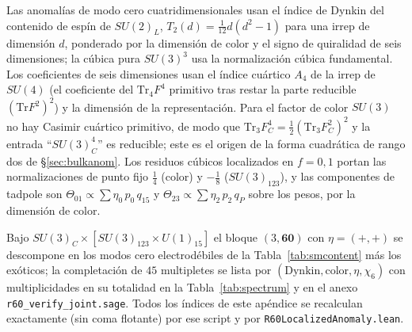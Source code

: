 \documentclass[11pt,a4paper]{article}
\newcommand{\Tr}{\mathrm{Tr}}
\begin{document}
Las anomal\'ias de modo cero cuatridimensionales usan el \'indice de Dynkin del contenido de
esp\'in de $SU(2)_L$, $T_2(d)=\tfrac1{12}d(d^2-1)$ para una irrep de dimensi\'on $d$, ponderado
por la dimensi\'on de color y el signo de quiralidad de seis dimensiones; la c\'ubica pura
$SU(3)^3$ usa la normalizaci\'on c\'ubica fundamental. Los coeficientes de seis dimensiones usan
el \'indice cu\'artico $A_4$ de la irrep de $SU(4)$ (el coeficiente del $\Tr_4 F^4$ primitivo tras
restar la parte reducible $(\Tr F^2)^2$) y la dimensi\'on de la representaci\'on. Para el factor
de color $SU(3)$ no hay Casimir cu\'artico primitivo, de modo que $\Tr_3 F_C^4=\tfrac12(\Tr_3
F_C^2)^2$ y la entrada ``$SU(3)_C^4$'' es reducible; este es el origen de la forma cuadr\'atica de
rango dos de \S\ref{sec:bulkanom}. Los residuos c\'ubicos localizados en $f=0,1$ portan las
normalizaciones de punto fijo $\tfrac14$ (color) y $-\tfrac18$ ($SU(3)_{123}$), y las componentes
de tadpole son $\Theta_{01}\propto\sum \eta_0\,p_0\,q_{15}$ y $\Theta_{23}\propto\sum
\eta_2\,p_2\,q_P$ sobre los pesos, por la dimensi\'on de color.

Bajo $SU(3)_C\times[SU(3)_{123}\times U(1)_{15}]$ el bloque $(3,\mathbf{60})$ con $\eta=(+,+)$ se
descompone en los modos cero electrod\'ebiles de la Tabla~\ref{tab:smcontent} m\'as los ex\'oticos;
la completaci\'on de $45$ multipletes se lista por $(\text{Dynkin},\text{color},\eta,\chi_6)$ con
multiplicidades en su totalidad en la Tabla~\ref{tab:spectrum} y en el anexo
\texttt{r60\_verify\_joint.sage}. Todos los \'indices de este ap\'endice se recalculan exactamente
(sin coma flotante) por ese script y por \texttt{R60LocalizedAnomaly.lean}.
\end{document}
